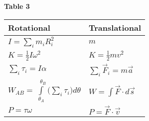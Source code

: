 \documentclass[a4paper]{article}
\let\bf\textbf
\begin{document}
\begin{center}
    \begin{minipage}{0.45\textwidth}
        \bf{Table 3}\vspace{2mm}\\
        \begin{tabularx}{1\textwidth}{
            | >{\raggedright\arraybackslash}X
            | >{\raggedright\arraybackslash}X |
        }
            \hline
            Rotational & Translational\\
            \hline
            $\displaystyle I = \sum_{i}^{}m_iR^2_i$ & $m$\\
            \hline
            $\displaystyle K = \frac{1}{2}I\omega^2$ & $\displaystyle K = \frac{1}{2}mv^2$\\
            \hline
            $\displaystyle \sum_{i}^{}\tau_i = I\alpha$ & $\displaystyle \sum_{i}\vec{F}_i = m\vec{a}$\\
            \hline
            $\displaystyle W_{AB} = \int\limits_{\theta_A}^{\text{ }\theta_B}\bigg(\sum_{i}\tau_i\bigg)d\theta$ & $\displaystyle W = \int\vec{F}\cdot d\vec{s}$\\
            \hline
            $P = \tau\omega$ & $P = \vec{F}\cdot\vec{v}$\\[2.5pt]
            \hline
        \end{tabularx}
    \end{minipage}
\end{center}
\end{document}
